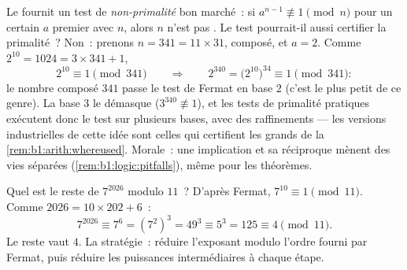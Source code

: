 \begin{example}\label{ex:b1:arith:pseudoprime}
Le  fournit un test de \emph{non-primalité} bon
marché~: si $a^{n-1} \not\equiv 1 \pmod n$ pour un certain $a$ premier avec $n$,
alors $n$ n'est pas . Le test pourrait-il aussi certifier la primalité~? Non~:
prenons $n = 341 = 11 \times 31$, composé, et $a = 2$. Comme
$2^{10} = 1024 = 3 \times 341 + 1$,
\[
2^{10} \equiv 1 \pmod{341}
\qquad\Longrightarrow\qquad
2^{340} = \bigl(2^{10}\bigr)^{34} \equiv 1 \pmod{341} :
\]
le nombre composé $341$ passe le test de Fermat en base $2$ (c'est le
plus petit \emph{} de ce genre). La base $3$ le démasque
($3^{340} \not\equiv 1$), et les tests de primalité pratiques
exécutent donc le test sur plusieurs bases, avec des raffinements ---
les versions industrielles de cette idée sont celles qui certifient les
grands  de la \cref{rem:b1:arith:whereused}. Morale~: une implication
et sa réciproque mènent des vies séparées
(\cref{rem:b1:logic:pitfalls}), même pour les théorèmes.
\end{example}

\begin{example}\label{ex:b1:arith:congruences}
Quel est le reste de $7^{2026}$ modulo $11$~? D'après Fermat, $7^{10}
\equiv 1 \pmod{11}$. Comme $2026 = 10 \times 202 + 6$~:
\[
7^{2026} \equiv 7^6 = (7^2)^3 = 49^3 \equiv 5^3 = 125 \equiv 4
\pmod{11}.
\]
Le reste vaut $4$. La stratégie~: réduire l'exposant modulo l'ordre
fourni par Fermat, puis réduire les puissances intermédiaires à chaque
étape.
\end{example}

